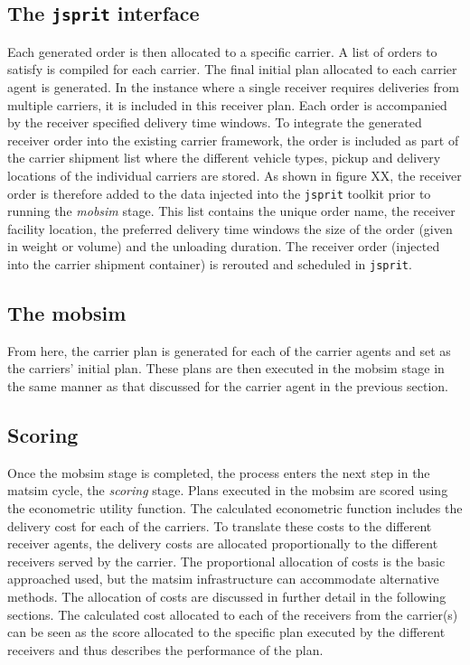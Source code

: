 \subsection{The \texttt{jsprit} interface}
Each generated order is then allocated to a specific carrier. A list of orders to satisfy is compiled for each carrier. The final initial plan allocated to each carrier agent is generated. In the instance where a single receiver requires deliveries from multiple carriers, it is included in this receiver plan. Each order is accompanied by the receiver specified delivery time windows. To integrate the generated receiver order into the existing carrier framework, the order is included as part of the carrier shipment list where the different vehicle types, pickup and delivery locations of the individual carriers are stored. As shown in figure XX, the receiver order is therefore added to the data injected into the \texttt{jsprit} toolkit prior to running the \textit{mobsim} stage. This list contains the unique order name, the receiver facility location, the preferred delivery time windows the size of the order (given in weight or volume) and the unloading duration. The receiver order (injected into the carrier shipment container) is rerouted and scheduled in \texttt{jsprit}.

\subsection{The mobsim}
From here, the carrier plan is generated for each of the carrier agents and set as the carriers' initial plan. These plans are then executed in the mobsim stage in the same manner as that discussed for the carrier agent in the previous section. \par

\subsection{Scoring}
Once the mobsim stage is completed, the process enters the next step in the \acrshort{matsim} cycle, the \textit{scoring} stage. Plans executed in the mobsim are scored using the econometric utility function. The calculated econometric function includes the delivery cost for each of the carriers. To translate these costs to the different receiver agents, the delivery costs are allocated proportionally to the different receivers served by the carrier. The proportional allocation of costs is the basic approached used, but the \acrshort{matsim} infrastructure can accommodate alternative methods. The allocation of costs are discussed in further detail in the following sections. The calculated cost allocated to each of the receivers from the carrier(s) can be seen as the score allocated to the specific plan executed by the different receivers and thus describes the performance of the plan. \par

